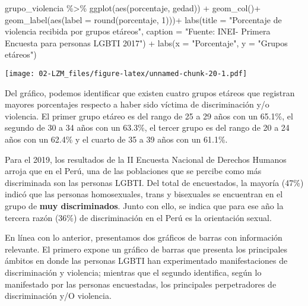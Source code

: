 \documentclass[
]{book}
\newenvironment{Shaded}{\begin{snugshade}}{\end{snugshade}}
\newcommand{\AttributeTok}[1]{\textcolor[rgb]{0.77,0.63,0.00}{#1}}
\newcommand{\DecValTok}[1]{\textcolor[rgb]{0.00,0.00,0.81}{#1}}
\newcommand{\FunctionTok}[1]{\textcolor[rgb]{0.00,0.00,0.00}{#1}}
\newcommand{\NormalTok}[1]{#1}
\newcommand{\SpecialCharTok}[1]{\textcolor[rgb]{0.00,0.00,0.00}{#1}}
\newcommand{\StringTok}[1]{\textcolor[rgb]{0.31,0.60,0.02}{#1}}
\theoremstyle{definition}
\theoremstyle{definition}
\theoremstyle{definition}
\theoremstyle{definition}
\theoremstyle{remark}
\begin{document}
\begin{Shaded}
\begin{Highlighting}[]
\NormalTok{grupo\_violencia }\SpecialCharTok{\%\textgreater{}\%} 
  \FunctionTok{ggplot}\NormalTok{(}\FunctionTok{aes}\NormalTok{(porcentaje, gedad)) }\SpecialCharTok{+}
  \FunctionTok{geom\_col}\NormalTok{()}\SpecialCharTok{+}
  \FunctionTok{geom\_label}\NormalTok{(}\FunctionTok{aes}\NormalTok{(}\AttributeTok{label =} \FunctionTok{round}\NormalTok{(porcentaje, }\DecValTok{1}\NormalTok{)))}\SpecialCharTok{+}
  \FunctionTok{labs}\NormalTok{(}\AttributeTok{title =} \StringTok{"Porcentaje de violencia recibida por grupos etáreos"}\NormalTok{, }
       \AttributeTok{caption =} \StringTok{"Fuente: INEI{-} Primera Encuesta para personas LGBTI 2017"}\NormalTok{) }\SpecialCharTok{+}
  \FunctionTok{labs}\NormalTok{(}\AttributeTok{x =} \StringTok{"Porcentaje"}\NormalTok{,}
       \AttributeTok{y =} \StringTok{"Grupos etáreos"}\NormalTok{)}
\end{Highlighting}
\end{Shaded}

\texttt{[image: 02-LZM\_files/figure-latex/unnamed-chunk-20-1.pdf]}

Del gráfico, podemos identificar que existen cuatro grupos etáreos que registran mayores porcentajes respecto a haber sido víctima de discriminación y/o violencia. El primer grupo etáreo es del rango de 25 a 29 años con un 65.1\%, el segundo de 30 a 34 años con un 63.3\%, el tercer grupo es del rango de 20 a 24 años con un 62.4\% y el cuarto de 35 a 39 años con un 61.1\%.

Para el 2019, los resultados de la II Encuesta Nacional de Derechos Humanos arroja que en el Perú, una de las poblaciones que se percibe como más discriminada son las personas LGBTI. Del total de encuestados, la mayoría (47\%) indicó que las personas homosexuales, trans y bisexuales se encuentran en el grupo de \textbf{muy discriminados}. Junto con ello, se indica que para ese año la tercera razón (36\%) de discriminación en el Perú es la orientación sexual.

En línea con lo anterior, presentamos dos gráficos de barras con información relevante. El primero expone un gráfico de barras que presenta los principales ámbitos en donde las personas LGBTI han experimentado manifestaciones de discriminación y violencia; mientras que el segundo identifica, según lo manifestado por las personas encuestadas, los principales perpetradores de discriminación y/O violencia.
\end{document}
